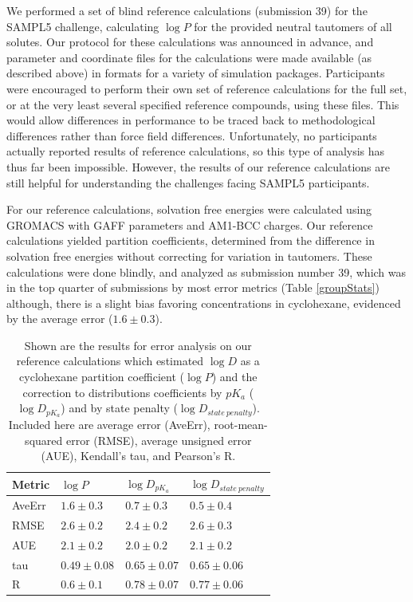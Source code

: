 We performed a set of blind reference calculations (submission 39) for the SAMPL5 challenge, calculating $\log P$ for the provided neutral tautomers of all solutes. 
Our protocol for these calculations was announced in advance, and parameter and coordinate files for the calculations were made available (as described above) in formats for a variety of simulation packages. 
Participants were encouraged to perform their own set of reference calculations for the full set, or at the very least several specified reference compounds, using these files.
This would allow differences in performance to be traced back to methodological differences rather than force field differences. 
Unfortunately, no participants actually reported results of reference calculations, so this type of analysis has thus far been impossible.  
However, the results of our reference calculations are still helpful for understanding the challenges facing SAMPL5 participants. 

For our reference calculations, solvation free energies were calculated using GROMACS with GAFF parameters and AM1-BCC charges. 
Our reference calculations yielded partition coefficients, determined from the difference in solvation free energies without correcting for variation in tautomers. 
These calculations were done blindly, and analyzed as submission number 39, which was in the top quarter of submissions by most error metrics (Table \ref{groupStats}) %
although, there is a slight bias favoring concentrations in cyclohexane, evidenced by the average error ($1.6 \pm 0.3$).

\begin{table}
\footnotesize
\begin{tabular}{| l |l |l | l |} 
\hline 
Metric & $\log P$ & $\log D_{pK_a}$ & $\log D_{state\ penalty}$ \\ 
\hline 
AveErr & $ 1.6 \pm 0.3$ & $ 0.7 \pm 0.3 $ & $ 0.5 \pm 0.4 $ \\ 
RMSE & $ 2.6 \pm 0.2$ & $ 2.4 \pm 0.2 $ & $ 2.6 \pm 0.3 $ \\ 
AUE & $ 2.1 \pm 0.2$ & $ 2.0 \pm 0.2 $ & $ 2.1 \pm 0.2 $ \\ 
tau & $ 0.49 \pm 0.08$ & $ 0.65 \pm 0.07 $ & $ 0.65 \pm 0.06 $ \\ 
R & $ 0.6 \pm 0.1$ & $ 0.78 \pm 0.07 $ & $ 0.77 \pm 0.06 $ \\ 
\hline
\end{tabular}
\label{MobleyStats}
\caption{Shown are the results for error analysis on our reference calculations which estimated $\log D$ as a cyclohexane partition coefficient ($\log P$) and the correction to distributions coefficients by $pK_a$ ($\log D_{pK_a}$) and by state penalty ($\log D_{state\ penalty}$). Included here are average error (AveErr), root-mean-squared error (RMSE), average unsigned error (AUE), Kendall's tau, and Pearson's R.}
\end{table}


